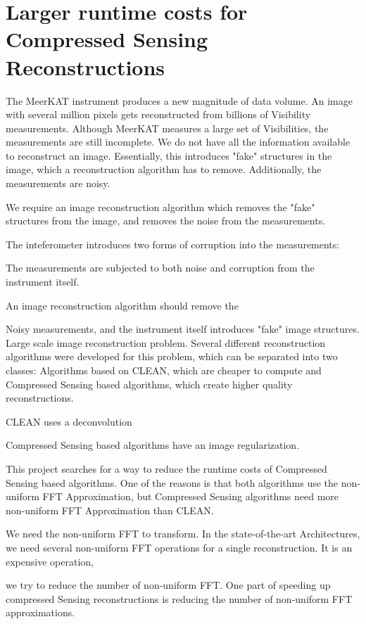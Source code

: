 \section{Larger runtime costs for Compressed Sensing Reconstructions}\label{hypo}
The MeerKAT instrument produces a new magnitude of data volume. An image with several million pixels gets reconstructed from billions of Visibility measurements. Although MeerKAT measures a large set of Visibilities, the measurements are still incomplete. We do not have all the information available to reconstruct an image. Essentially, this introduces "fake" structures in the image, which a reconstruction algorithm has to remove. Additionally, the measurements are noisy.

We require an image reconstruction algorithm which removes the "fake" structures from the image, and removes the noise from the measurements. 



The inteferometer introduces two forms of corruption into the measurements:

The measurements are subjected to both noise and corruption from the instrument itself.  

 An image reconstruction algorithm should remove the 

Noisy measurements, and the instrument itself introduces "fake" image structures. Large scale image reconstruction problem. Several different reconstruction algorithms were developed for this problem, which can be separated into two classes: Algorithms based on CLEAN, which are cheaper to compute and Compressed Sensing based algorithms, which create higher quality reconstructions.

CLEAN uses a deconvolution

Compressed Sensing based algorithms have an image regularization. 
 
This project searches for a way to reduce the runtime costs of Compressed Sensing based algorithms.
 One of the reasons is that both algorithms use the non-uniform FFT Approximation, but Compressed Sensing algorithms need more non-uniform FFT Approximation than CLEAN.

We need the non-uniform FFT to transform. In the state-of-the-art Architectures, we need several non-uniform FFT operations for a single reconstruction. It is an expensive operation, 

we try to reduce the number of non-uniform FFT. One part of speeding up compressed Sensing reconstructions is reducing the number of non-uniform FFT approximations.

